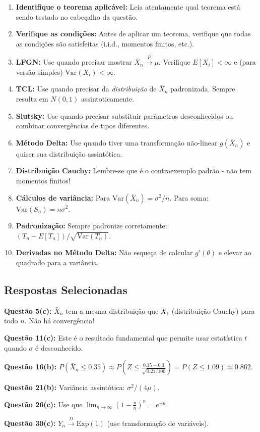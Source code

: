 \documentclass[12pt,a4paper]{article}
\begin{document}
\begin{enumerate}
    \item \textbf{Identifique o teorema aplicável:} Leia atentamente qual teorema está sendo testado no cabeçalho da questão.
    
    \item \textbf{Verifique as condições:} Antes de aplicar um teorema, verifique que todas as condições são satisfeitas (i.i.d., momentos finitos, etc.).
    
    \item \textbf{LFGN:} Use quando precisar mostrar $\bar{X}_n \xrightarrow{P} \mu$. Verifique $E[X_i] < \infty$ e (para versão simples) $\text{Var}(X_i) < \infty$.
    
    \item \textbf{TCL:} Use quando precisar da \emph{distribuição} de $\bar{X}_n$ padronizada. Sempre resulta em $N(0,1)$ assintoticamente.
    
    \item \textbf{Slutsky:} Use quando precisar substituir parâmetros desconhecidos ou combinar convergências de tipos diferentes.
    
    \item \textbf{Método Delta:} Use quando tiver uma transformação não-linear $g(\bar{X}_n)$ e quiser sua distribuição assintótica.
    
    \item \textbf{Distribuição Cauchy:} Lembre-se que é o contraexemplo padrão - não tem momentos finitos!
    
    \item \textbf{Cálculos de variância:} Para $\text{Var}(\bar{X}_n) = \sigma^2/n$. Para soma: $\text{Var}(S_n) = n\sigma^2$.
    
    \item \textbf{Padronização:} Sempre padronize corretamente: $(T_n - E[T_n])/\sqrt{\text{Var}(T_n)}$.
    
    \item \textbf{Derivadas no Método Delta:} Não esqueça de calcular $g'(\theta)$ e elevar ao quadrado para a variância.
\end{enumerate}

\subsection{Respostas Selecionadas}

\textbf{Questão 5(c):} $\bar{X}_n$ tem a mesma distribuição que $X_1$ (distribuição Cauchy) para todo $n$. Não há convergência!

\textbf{Questão 11(c):} Este é o resultado fundamental que permite usar estatística $t$ quando $\sigma$ é desconhecido.

\textbf{Questão 16(b):} $P(\bar{X}_n \leq 0.35) \approx P\left(Z \leq \frac{0.35 - 0.3}{\sqrt{0.21/100}}\right) = P(Z \leq 1.09) \approx 0.862$.

\textbf{Questão 21(b):} Variância assintótica: $\sigma^2/(4\mu)$.

\textbf{Questão 26(c):} Use que $\lim_{n \to \infty} \left(1 - \frac{u}{n}\right)^n = e^{-u}$.

\textbf{Questão 30(c):} $Y_n \xrightarrow{D} \text{Exp}(1)$ (use transformação de variáveis).
\end{document}
